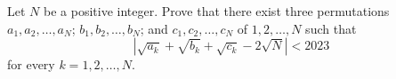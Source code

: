 Let $N$ be a positive integer. Prove that there exist three permutations $a_1, a_2, \ldots, a_N$; $b_1, b_2, \ldots, b_N$; and $c_1, c_2, \ldots, c_N$ of $1, 2, \ldots, N$ such that
\[ \left| \sqrt{a_k} + \sqrt{b_k} + \sqrt{c_k} - 2\sqrt{N} \right| < 2023 \]
for every $k = 1, 2, \ldots, N$.
